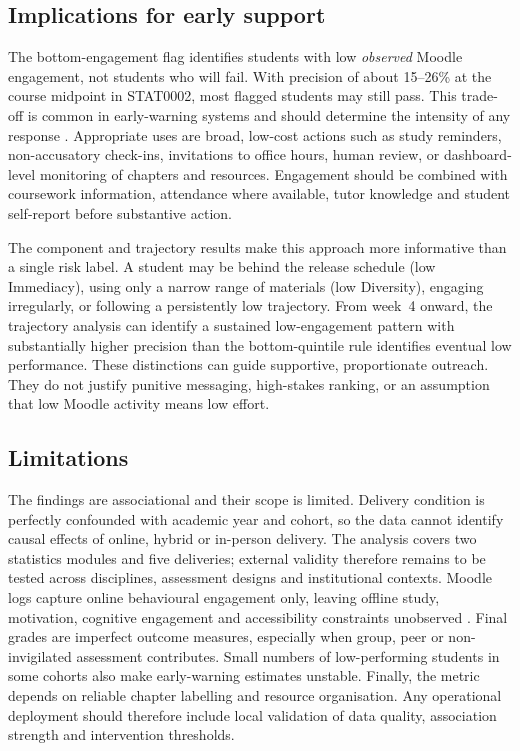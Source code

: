 \documentclass[11pt,a4paper]{article}
\begin{document}
\subsection{Implications for early support}
The bottom-engagement flag identifies students with low \emph{observed} Moodle
engagement, not students who will fail. With precision of about 15--26\% at the
course midpoint in STAT0002, most flagged students may still pass. This trade-off
is common in early-warning systems and should determine the intensity of any
response \citep{conijn2017,akcapinar2019}. Appropriate uses are broad, low-cost
actions such as study reminders, non-accusatory check-ins, invitations to office
hours, human review, or dashboard-level monitoring of chapters and resources.
Engagement should be combined with coursework information, attendance where
available, tutor knowledge and student self-report before substantive action.

The component and trajectory results make this approach more informative than a
single risk label. A student may be behind the release schedule (low Immediacy),
using only a narrow range of materials (low Diversity), engaging irregularly, or
following a persistently low trajectory. From week~4 onward, the trajectory
analysis can identify a sustained low-engagement pattern with substantially higher
precision than the bottom-quintile rule identifies eventual low performance.
These distinctions can guide supportive, proportionate outreach. They do not
justify punitive messaging, high-stakes ranking, or an assumption that low Moodle
activity means low effort.

\subsection{Limitations}
The findings are associational and their scope is limited. Delivery condition is
perfectly confounded with academic year and cohort, so the data cannot identify
causal effects of online, hybrid or in-person delivery. The analysis covers two
statistics modules and five deliveries; external validity therefore remains to be
tested across disciplines, assessment designs and institutional contexts. Moodle
logs capture online behavioural engagement only, leaving offline study,
motivation, cognitive engagement and accessibility constraints unobserved
\citep{martinborup2022,nkomo2021}. Final grades are imperfect outcome measures,
especially when group, peer or non-invigilated assessment contributes. Small
numbers of low-performing students in some cohorts also make early-warning
estimates unstable. Finally, the metric depends on reliable chapter labelling and
resource organisation. Any operational deployment should therefore include local
validation of data quality, association strength and intervention thresholds.
\end{document}

